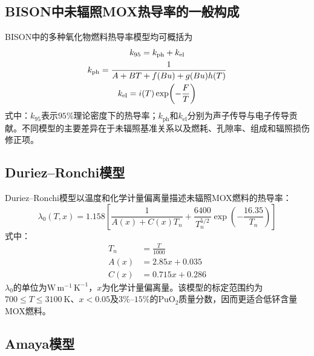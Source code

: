 \subsection{BISON中未辐照MOX热导率的一般构成}

BISON中的多种氧化物燃料热导率模型均可概括为
\begin{gather}
	k_{95}=k_{\mathrm{ph}}+k_{\mathrm{el}}
	\notag
	\\
	k_{\mathrm{ph}}
	=\frac{1}{A+BT+f(Bu)+g(Bu)h(T)}
	\notag
	\\
	k_{\mathrm{el}}
	=i(T)\exp\!\left(-\frac{F}{T}\right)
	\label{eq:appendix_bison_thermal_conductivity_general}
\end{gather}
\label{eq:appendix_bison_k95}
\label{eq:appendix_bison_phonon}
\label{eq:appendix_bison_electronic}
\noindent 式中：$k_{95}$表示$95\%$理论密度下的热导率；$k_{\mathrm{ph}}$和$k_{\mathrm{el}}$分别为声子传导与电子传导贡献。不同模型的主要差异在于未辐照基准关系以及燃耗、孔隙率、组成和辐照损伤修正项。

\subsection{Duriez--Ronchi模型}

Duriez--Ronchi模型以温度和化学计量偏离量描述未辐照MOX燃料的热导率：
\begin{equation}
	\lambda_0(T,x)=1.158
	\left[
	\frac{1}{A(x)+C(x)T_n}
	+\frac{6400}{T_n^{5/2}}
	\exp\!\left(-\frac{16.35}{T_n}\right)
	\right]
	\label{eq:appendix_duriez_ronchi}
\end{equation}
\noindent 式中：
\begin{equation}
	\begin{aligned}
		T_n&=\frac{T}{1000}\\
				A(x)&=2.85x+0.035\\
				C(x)&=0.715x+0.286
	\end{aligned}
	\label{eq:appendix_duriez_parameters}
\end{equation}
\label{eq:appendix_duriez_reduced_temperature}
\label{eq:appendix_duriez_A}
\label{eq:appendix_duriez_C}
$\lambda_0$的单位为$\mathrm{W\,m^{-1}\,K^{-1}}$，$x$为化学计量偏离量。该模型的标定范围约为$700\leq T\leq3100\ \mathrm{K}$、$x<0.05$及$3\%$--$15\%$的$\mathrm{PuO}_2$质量分数，因而更适合低钚含量MOX燃料。

\subsection{Amaya模型}

